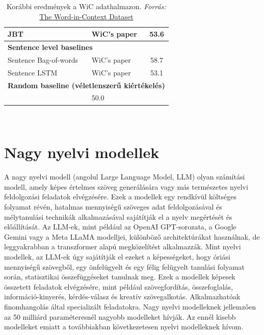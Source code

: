 \documentclass[12pt]{report}
\begin{document}
\begin{table}[h]
\begin{tabular}{l l c}
            JBT                                & WiC's paper               & 53.6                  \\
            \midrule
            \multicolumn{3}{l}{\textbf{Sentence level baselines}} \\
            Sentence Bag-of-words              & WiC's paper               & 58.7                  \\
            Sentence LSTM                      & WiC's paper               & 53.1                  \\
            \midrule
            \multicolumn{3}{l}{\textbf{Random baseline (véletlenszerű kiértékelés)}} \\
            & 50.0 \\
            \bottomrule
        \end{tabular}
        \caption{Korábbi eredmények a WiC adathalmazon.\textit{ Forrás:} \href{https://pilehvar.github.io/wic/}{The Word-in-Context Dataset}}~\cite{pilehvar2019wic}

        \label{tab:state_of_the_art}
    \end{table}


    \clearpage


    \chapter{Nagy nyelvi modellek}

    A nagy nyelvi modell (angolul Large Language Model, LLM) olyan számítási modell, amely képes értelmes szöveg generálására vagy más természetes nyelvi feldolgozási feladatok elvégzésére. Ezek a modellek egy rendkívül költséges folyamat révén, hatalmas mennyiségű szöveges adat feldolgozásával és mélytanulási technikák alkalmazásával sajátítják el a nyelv megértését és előállítását. Az LLM-ek, mint például az OpenAI GPT-sorozata, a Google Gemini vagy a Meta LLaMA modelljei, különböző architektúrákat használnak, de leggyakrabban a transzformer alapú megközelítést alkalmazzák. Mint nyelvi modellek, az LLM-ek úgy sajátítják el ezeket a képességeket, hogy óriási mennyiségű szövegből, egy önfelügyelt és egy félig felügyelt tanulási folyamat során, statisztikai összefüggéseket tanulnak meg. Ezek a modellek képesek összetett feladatok elvégzésére, mint például szövegfordítás, összefoglalás, információ-kinyerés, kérdés-válasz és kreatív szövegalkotás. Alkalmazhatóak finomhangolás által specializált feladatokra. Nagy nyelvi modelleknek jellemzően az 50 milliárd paraméteresnél nagyobb modelleket hívják. Az ennél kisebb modelleket emiatt a továbbiakban következetesen nyelvi modelleknek hívom.
\end{document}
